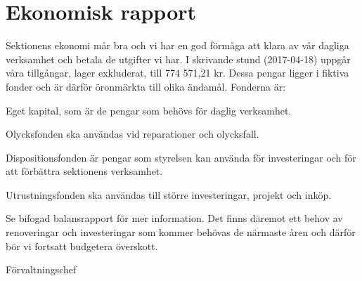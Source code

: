 \documentclass[../_main/handlingar.tex]{subfiles}
\begin{document}
\section{Ekonomisk rapport}

Sektionens ekonomi mår bra och vi har en god förmåga att klara av vår dagliga verksamhet och betala de utgifter vi har. I skrivande stund (2017-04-18) uppgår våra tillgångar, lager exkluderat, till 774 571,21 kr. Dessa pengar ligger i fiktiva fonder och är därför öronmärkta till olika ändamål. Fonderna är:
\begin{dashlist}
\item {Eget kapital, som är de pengar som behövs för daglig verksamhet.}
\item {Olycksfonden ska användas vid reparationer och olycksfall.} 
\item {Dispositionsfonden är pengar som styrelsen kan använda för investeringar och för att förbättra sektionens verksamhet.}
\item {Utrustningsfonden ska användas till större investeringar, projekt och inköp.}
\end{dashlist}

Se bifogad balansrapport för mer information. 
Det finns däremot ett behov av renoveringar och investeringar som kommer behövas de närmaste åren och därför bör vi fortsatt budgetera överskott. 


\begin{signatures}{1}
    \mvh
    \signature{\fvc}{Förvaltningschef}
\end{signatures}
\end{document}
